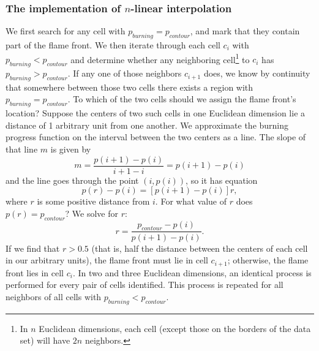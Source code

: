 \subsubsection{The implementation of $n$-linear interpolation} We first search for any cell with $p_{burning} = p_{contour}$, and mark that they contain part of the flame front. We then iterate through each cell $c_i$ with $p_{burning} < p_{contour}$ and determine whether any neighboring cell\footnote{In $n$ Euclidean dimensions, each cell (except those on the borders of the data set) will have $2n$ neighbors.} to $c_i$ has $p_{burning} > p_{contour}$. If any one of those neighbors $c_{i+1}$ does, we know by continuity that somewhere between those two cells there exists a region with $p_{burning} = p_{contour}$. To which of the two cells should we assign the flame front's location? Suppose the centers of two such cells in one Euclidean dimension lie a distance of 1 arbitrary unit from one another. We approximate the burning progress function on the interval between the two centers as a line. The slope of that line $m$ is given by
\begin{equation}
	m = \frac{p(i+1)-p(i)}{i+1 - i} = p(i+1) - p(i)
\end{equation}
and the line goes through the point $(i, p(i))$, so it has equation
\begin{equation}
	p(r) - p(i) = [p(i+1) - p(i)]r,
\end{equation}
where $r$ is some positive distance from $i$. For what value of $r$ does $p(r) = p_{contour}$? We solve for $r$:
\begin{equation}
	r = \frac{p_{contour} - p(i)}{p(i + 1) - p(i)}.
\end{equation}
If we find that $r > 0.5$ (that is, half the distance between the centers of each cell in our arbitrary units), the flame front must lie in cell $c_{i+1}$; otherwise, the flame front lies in cell $c_i$. In two and three Euclidean dimensions, an identical process is performed for every pair of cells identified. This process is repeated for all neighbors of all cells with $p_{burning} < p_{contour}$.


